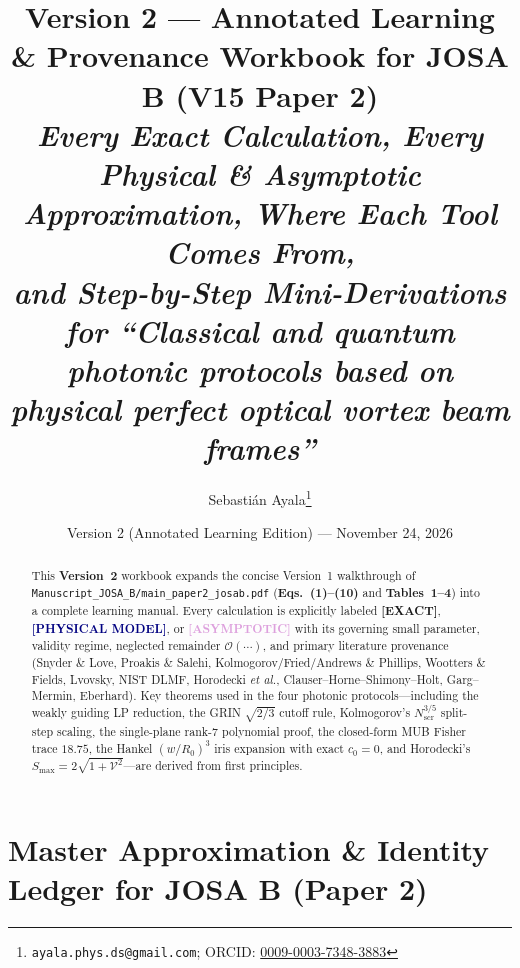 \documentclass[10pt,letterpaper]{article}
\title{\vspace{-1.0cm}\textbf{\Large Version 2 --- Annotated Learning \& Provenance Workbook for JOSA B (V15 Paper 2)}\\[0.35em]
\large\textit{Every Exact Calculation, Every Physical \& Asymptotic Approximation, Where Each Tool Comes From,\\
and Step-by-Step Mini-Derivations for ``Classical and quantum photonic protocols based on\\
physical perfect optical vortex beam frames''}}
\author{Sebasti\'an Ayala\thanks{\texttt{ayala.phys.ds@gmail.com}; ORCID: \href{https://orcid.org/0009-0003-7348-3883}{0009-0003-7348-3883}}}
\date{Version 2 (Annotated Learning Edition) --- November 24, 2026}
\newcommand{\tagexact}{\textcolor{forest}{\textbf{[EXACT]}}}
\newcommand{\tagmodel}{\textcolor{navy}{\textbf{[PHYSICAL MODEL]}}}
\newcommand{\tagasymp}{\textcolor{plum}{\textbf{[ASYMPTOTIC]}}}
\numberwithin{equation}{section}
\begin{document}
\maketitle
\thispagestyle{plain}

\begin{abstract}
\noindent This \textbf{Version~2} workbook expands the concise Version~1 walkthrough of \texttt{Manuscript\_JOSA\_B/main\_paper2\_josab.pdf} (\textbf{Eqs.~(1)--(10)} and \textbf{Tables~1--4}) into a complete learning manual. Every calculation is explicitly labeled \tagexact{}, \tagmodel{}, or \tagasymp{} with its governing small parameter, validity regime, neglected remainder $\mathcal{O}(\cdots)$, and primary literature provenance (Snyder \& Love, Proakis \& Salehi, Kolmogorov/Fried/Andrews \& Phillips, Wootters \& Fields, Lvovsky, NIST DLMF, Horodecki \emph{et al.}, Clauser--Horne--Shimony--Holt, Garg--Mermin, Eberhard). Key theorems used in the four photonic protocols---including the weakly guiding LP reduction, the GRIN $\sqrt{2/3}$ cutoff rule, Kolmogorov's $N_{\mathrm{scr}}^{3/5}$ split-step scaling, the single-plane rank-$7$ polynomial proof, the closed-form MUB Fisher trace $18.75$, the Hankel $(w/R_0)^3$ iris expansion with exact $c_0 = 0$, and Horodecki's $S_{\max} = 2\sqrt{1+\mathcal{V}^2}$---are derived from first principles.
\end{abstract}

\tableofcontents
\vspace{0.5em}

\section*{Master Approximation \& Identity Ledger for JOSA B (Paper 2)}
\end{document}
